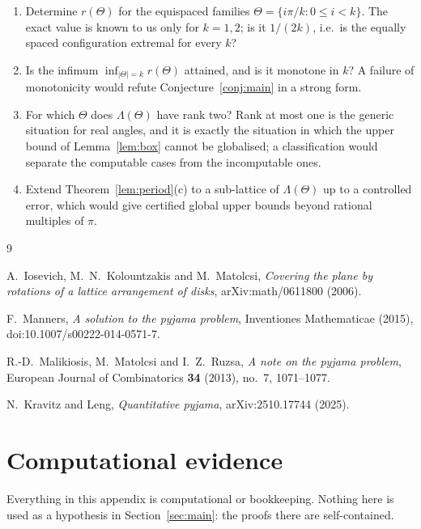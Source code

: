 \documentclass[11pt]{article}
\theoremstyle{plain}
\theoremstyle{definition}
\theoremstyle{remark}
\begin{document}
\begin{enumerate}
\item[(Q1)] Determine $r(\Theta)$ for the equispaced families $\Theta=\{i\pi/k : 0\le i<k\}$. The exact
value is known to us only for $k=1,2$; is it $1/(2k)$, i.e.\ is the equally spaced configuration
extremal for every $k$?
\item[(Q2)] Is the infimum $\inf_{|\Theta|=k}r(\Theta)$ attained, and is it monotone in $k$? A failure
of monotonicity would refute Conjecture~\ref{conj:main} in a strong form.
\item[(Q3)] For which $\Theta$ does $\Lambda(\Theta)$ have rank two? Rank at most one is the generic
situation for real angles, and it is exactly the situation in which the upper bound of
Lemma~\ref{lem:box} cannot be globalised; a classification would separate the computable cases from the
incomputable ones.
\item[(Q4)] Extend Theorem~\ref{lem:period}(c) to a sub-lattice of $\Lambda(\Theta)$ up to a controlled
error, which would give certified global upper bounds beyond rational multiples of $\pi$.
\end{enumerate}

\begin{thebibliography}{9}

A.~Iosevich, M.~N.~Kolountzakis and M.~Matolcsi,
\emph{Covering the plane by rotations of a lattice arrangement of disks},
arXiv:math/0611800 (2006).

F.~Manners,
\emph{A solution to the pyjama problem},
Inventiones Mathematicae (2015), doi:10.1007/s00222-014-0571-7.

R.-D.~Malikiosis, M.~Matolcsi and I.~Z.~Ruzsa,
\emph{A note on the pyjama problem},
European Journal of Combinatorics \textbf{34} (2013), no.~7, 1071--1077.

N.~Kravitz and Leng,
\emph{Quantitative pyjama},
arXiv:2510.17744 (2025).

\end{thebibliography}

\appendix
\section{Computational evidence}
\label{app:comp}

Everything in this appendix is computational or bookkeeping. Nothing here is used as a hypothesis in
Section~\ref{sec:main}: the proofs there are self-contained.
\end{document}
